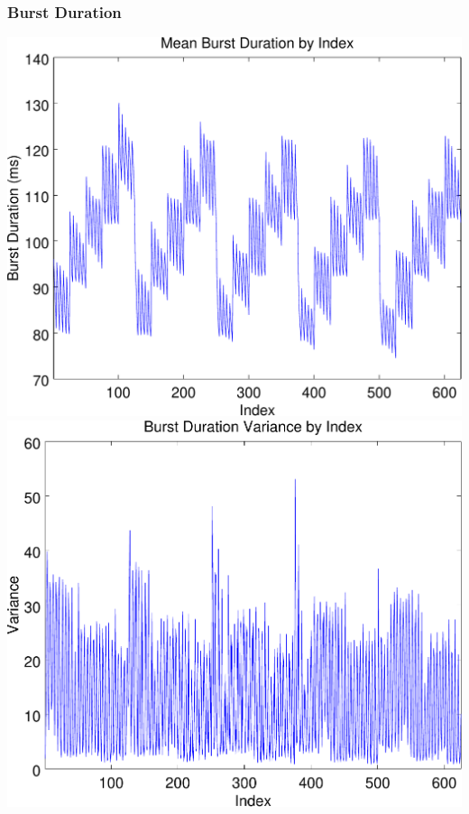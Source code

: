 \documentclass{beamer}
\theoremstyle{plain}
\theoremstyle{definition}
\begin{document}
\begin{frame}\frametitle{Burst Duration}
  \begin{center}
    \includegraphics[scale=.32]{BurstDuration.pdf}%
    \includegraphics[scale=.32]{BurstDurationVariance.pdf}
  \end{center}
\end{frame}
\end{document}
